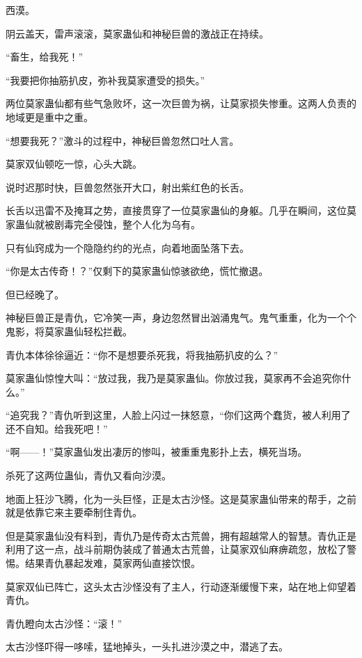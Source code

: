 
\begin{this_body}



西漠。

阴云盖天，雷声滚滚，莫家蛊仙和神秘巨兽的激战正在持续。

“畜生，给我死！”

“我要把你抽筋扒皮，弥补我莫家遭受的损失。”

两位莫家蛊仙都有些气急败坏，这一次巨兽为祸，让莫家损失惨重。这两人负责的地域更是重中之重。

“想要我死？”激斗的过程中，神秘巨兽忽然口吐人言。

莫家双仙顿吃一惊，心头大跳。

说时迟那时快，巨兽忽然张开大口，射出紫红色的长舌。

长舌以迅雷不及掩耳之势，直接贯穿了一位莫家蛊仙的身躯。几乎在瞬间，这位莫家蛊仙就被剧毒完全侵蚀，整个人化为乌有。

只有仙窍成为一个隐隐约约的光点，向着地面坠落下去。

“你是太古传奇！？”仅剩下的莫家蛊仙惊骇欲绝，慌忙撤退。

但已经晚了。

神秘巨兽正是青仇，它冷笑一声，身边忽然冒出汹涌鬼气。鬼气重重，化为一个个鬼影，将莫家蛊仙轻松拦截。

青仇本体徐徐逼近：“你不是想要杀死我，将我抽筋扒皮的么？”

莫家蛊仙惊惶大叫：“放过我，我乃是莫家蛊仙。你放过我，莫家再不会追究你什么。”

“追究我？”青仇听到这里，人脸上闪过一抹怒意，“你们这两个蠢货，被人利用了还不自知。给我死吧！”

“啊——！”莫家蛊仙发出凄厉的惨叫，被重重鬼影扑上去，横死当场。

杀死了这两位蛊仙，青仇又看向沙漠。

地面上狂沙飞腾，化为一头巨怪，正是太古沙怪。这是莫家蛊仙带来的帮手，之前就是依靠它来主要牵制住青仇。

但是莫家蛊仙没有料到，青仇乃是传奇太古荒兽，拥有超越常人的智慧。青仇正是利用了这一点，战斗前期伪装成了普通太古荒兽，让莫家双仙麻痹疏忽，放松了警惕。结果青仇暴起发难，莫家两仙直接饮恨。

莫家双仙已阵亡，这头太古沙怪没有了主人，行动逐渐缓慢下来，站在地上仰望着青仇。

青仇瞪向太古沙怪：“滚！”

太古沙怪吓得一哆嗦，猛地掉头，一头扎进沙漠之中，潜逃了去。


\end{this_body}
